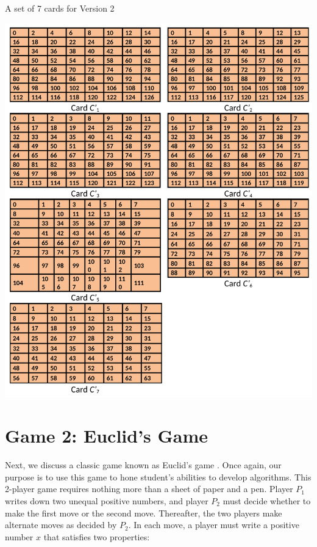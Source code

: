 \begin{multicols}{2}
\begin{table}[H]
\centering
\caption{A set of 7 cards for Version 2}\label{chapter-3-table-3}
\includegraphics[scale=.62]{src/Figures/chap2/table3.jpg}

\vspace{-.3cm}

\end{table}

\vspace{-.3cm}

\section{Game 2: Euclid's Game}\label{section-4} 

\vspace{-.2cm}

Next, we discuss a classic game known as Euclid’s game \cite{art2-key02}\cite{art2-key03}. Once again, our purpose is to use this game to hone student's abilities to develop algorithms. This 2-player game requires nothing more than a sheet of paper and a pen. Player $P_{1}$ writes down two unequal positive numbers, and player $P_{2}$ must decide whether to make the first move or the second move. Thereafter, the two players make alternate moves as decided by $P_{2}$. In each move, a player must write a positive number $x$ that satisfies two properties:
\begin{itemize}


\end{itemize}
\end{multicols}
